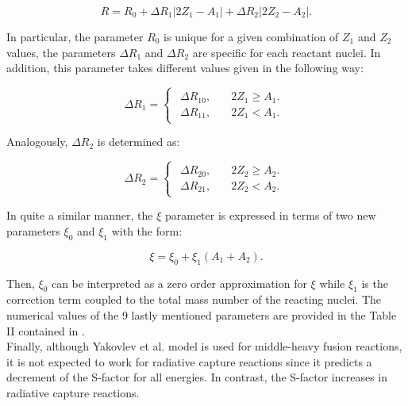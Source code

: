 \documentclass[openany]{book}
\begin{document}
\begin{equation} \label{eq:potential_Yakovlev_R}
	R = R_0 + \Delta R_{1} |2Z_1 - A_1| + \Delta R_{2}|2Z_2 - A_2|.
\end{equation}

In particular, the parameter $R_0$ is unique for a given combination of $Z_1$ and $Z_2$ values,  the parameters $\Delta R_{1}$ and $\Delta R_{2}$ are specific for each reactant nuclei. In addition, this parameter takes different values given in the following way: 

\begin{equation} \label{eq:potential_Yakovlev_R1}
	\Delta R_1= 	\left\{\begin{array}{l}
		\begin{split}
			\Delta R_{10}, \quad & 2Z_1 \ge A_1.\\ 
			\Delta R_{11}, \quad & 2Z_1 < A_1.
		\end{split}
	\end{array}\right.
\end{equation}

Analogously, $\Delta R_2$ is determined as: 

\begin{equation} \label{eq:potential_Yakovlev_R2}
	\Delta R_2= 	\left\{\begin{array}{l}
		\begin{split}
			\Delta R_{20}, \quad & 2Z_2 \ge A_2.\\ 
			\Delta R_{21}, \quad & 2Z_2 < A_2.
		\end{split}
	\end{array}\right.
\end{equation}

In quite a similar manner, the $\xi$ parameter is expressed in terms of two new parameters $\xi_0$ and $\xi_1$ with the form:

\begin{equation} \label{eq:potential_Yakovlev_xi}
	\xi = 	\xi_0 + \xi_1(A_1 + A_2).
\end{equation}

Then, $\xi_0$ can be interpreted as a zero order approximation for $\xi$ while $\xi_1$ is the correction term coupled to the total mass number of the reacting nuclei. The numerical values of the 9 lastly mentioned parameters are provided in the Table II contained in \cite{yakovlev_beard_gasques_wiescher_2010}. \\

Finally, although Yakovlev et al. model is used for middle-heavy fusion reactions, it is not expected to work for radiative capture reactions since it predicts a decrement of the S-factor for all energies. In contrast, the S-factor increases in radiative capture reactions.  \\
\end{document}
